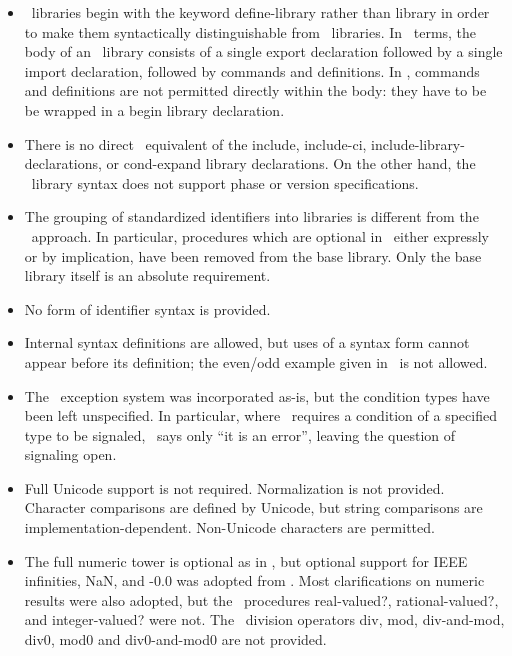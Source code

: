 \begin{itemize}
\item \rsevenrs\ libraries begin with the keyword {\cf define-library}
rather than {\cf library} in order to make them syntactically
distinguishable from \rsixrs\ libraries.
In \rsevenrs\ terms, the body of an \rsixrs\ library consists
of a single export declaration followed by a single import declaration,
followed by commands and definitions.  In \rsevenrs, commands and
definitions are not permitted directly within the body: they have to be be wrapped in a {\cf begin}
library declaration.

\item There is no direct \rsixrs\ equivalent of the {\cf include}, {\cf include-ci},
{\cf include-library-declarations}, or {\cf cond-expand} library declarations.
On the other hand, the \rsevenrs\ library syntax does not support phase or version specifications.

\item The grouping of standardized identifiers into libraries is different from the \rsixrs\
approach. In particular, procedures which are optional in \rfivers\, either expressly
or by implication, have been removed from the base library.
Only the base library itself is an absolute requirement.

\item No form of identifier syntax is provided. 

\item Internal syntax definitions are allowed, but uses of a syntax form
cannot appear before its definition; the {\cf even}/{\cf odd} example given in
\rsixrs\ is not allowed.

\item The \rsixrs\ exception system was incorporated as-is, but the condition
types have been left unspecified.  In particular, where \rsixrs\ requires
a condition of a specified type to be signaled, \rsevenrs\ says only
``it is an error'', leaving the question of signaling open.

\item Full Unicode support is not required.
Normalization is not provided.
Character comparisons are
defined by Unicode, but string comparisons are implementation-dependent.
Non-Unicode characters are permitted.

\item The full numeric tower is optional as in \rfivers, but optional support for IEEE
infinities, NaN, and {\mbox -0.0} was adopted from \rsixrs. Most clarifications on
numeric results were also adopted, but the \rsixrs\ procedures {\cf real-valued?},
{\cf rational-valued?}, and {\cf integer-valued}? were not. 
The \rsixrs\ division operators {\cf div}, {\cf mod}, {\cf div-and-mod}, {\cf
div0}, {\cf mod0} and {\cf div0-and-mod0} are not provided.


\end{itemize}
